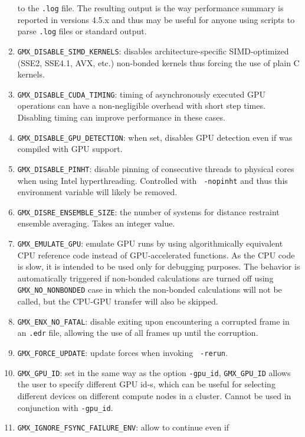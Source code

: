 \begin{enumerate}
        to the {\tt .log} file. The resulting output is the way performance summary is reported in versions
        4.5.x and thus may be useful for anyone using scripts to parse {\tt .log} files or standard output.
\item   {\tt GMX_DISABLE_SIMD_KERNELS}: disables architecture-specific SIMD-optimized (SSE2, SSE4.1, AVX, etc.)
        non-bonded kernels thus forcing the use of plain C kernels.
\item   {\tt GMX_DISABLE_CUDA_TIMING}: timing of asynchronously executed GPU operations can have a
        non-negligible overhead with short step times. Disabling timing can improve performance in these cases.
\item   {\tt GMX_DISABLE_GPU_DETECTION}: when set, disables GPU detection even if {\tt {}} was compiled
        with GPU support.
\item   {\tt GMX_DISABLE_PINHT}: disable pinning of consecutive threads to physical cores when using
        Intel hyperthreading. Controlled with {\tt {} -nopinht} and thus this environment
        variable will likely be removed.
\item   {\tt GMX_DISRE_ENSEMBLE_SIZE}: the number of systems for distance restraint ensemble
        averaging. Takes an integer value.
\item   {\tt GMX_EMULATE_GPU}: emulate GPU runs by using algorithmically equivalent CPU reference code instead of
        GPU-accelerated functions. As the CPU code is slow, it is intended to be used only for debugging purposes.
        The behavior is automatically triggered if non-bonded calculations are turned off using {\tt GMX_NO_NONBONDED}
        case in which the non-bonded calculations will not be called, but the CPU-GPU transfer will also be skipped.
\item   {\tt GMX_ENX_NO_FATAL}: disable exiting upon encountering a corrupted frame in an {\tt .edr}
        file, allowing the use of all frames up until the corruption.
\item   {\tt GMX_FORCE_UPDATE}: update forces when invoking {\tt {} -rerun}.
\item   {\tt GMX_GPU_ID}: set in the same way as the {\tt {}} option {\tt -gpu_id}, {\tt GMX_GPU_ID}
        allows the user to specify different GPU id-s, which can be useful for selecting different
        devices on different compute nodes in a cluster.  Cannot be used in conjunction with {\tt -gpu_id}.
\item   {\tt GMX_IGNORE_FSYNC_FAILURE_ENV}: allow {\tt {}} to continue even if

\end{enumerate}
